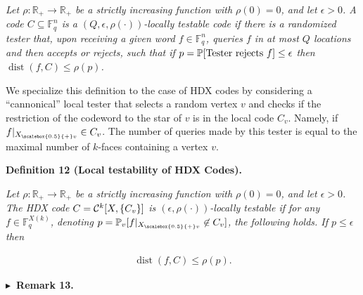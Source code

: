 \documentclass[10pt,a4paper]{article}
\begin{document}
\emph{Let $\rho:\mathbb{R}_{+}\to\mathbb{R}_{+}$ be a strictly increasing function with $\rho(0)=0$, and let $\epsilon>0$. A code $C\subseteq\mathbb{F}_{q}^{n}$ is a $(Q,\epsilon,\rho(\cdot))$-locally testable code if there is a randomized tester that, upon receiving a given word $f\in\mathbb{F}_{q}^{n}$, queries $f$ in at most $Q$ locations and then accepts or rejects, such that
if $p=\operatorname*{\mathbb{P}}[\hbox{Tester rejects }f]\leq\epsilon$ then $\operatorname{dist}(f,C)\leq\rho(p)$.}\par






We specialize this definition to the case of HDX codes by considering a “cannonical” local tester that selects a random vertex $v$ and checks if the restriction of the codeword to the star of $v$ is in the local code $C_{v}$. Namely, if $f|_{{X}_{\scalebox{0.5}{+}v}}\in C_{v}$. The number of queries made by this tester is equal to the maximal number of $k$-faces containing a vertex $v$.\par





\par\medskip\noindent\textbf{
\textbf{Definition 12}\textbf{ }(Local testability of HDX Codes)\textbf{.}
}\par



\emph{Let $\rho:\mathbb{R}_{+}\to\mathbb{R}_{+}$ be a strictly increasing function with $\rho(0)=0$, and let $\epsilon>0$.
The HDX code $C={\cal C}^{k}[X,\{C_{v}\}]$ is
$(\epsilon,\rho(\cdot))$-locally testable if for any $f\in\mathbb{F}_{q}^{X(k)}$, denoting $p=\operatorname*{\mathbb{P}}_{v}[f|_{{X}_{\scalebox{0.5}{+}v}}\not\in C_{v}]$, the following holds. If $p\leq\epsilon$ then}\par


\[\begin{gathered}
\operatorname{dist}(f,C)\leq\rho(p).
\end{gathered}\]







\par\medskip\noindent\textbf{
$\blacktriangleright$ Remark 13.
}\par
\end{document}
